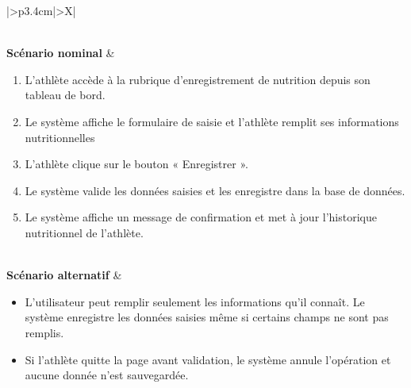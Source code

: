 \documentclass[a4paper,12pt]{report}
\begin{document}
\begin{table}[H]
\begin{tabularx}{\textwidth}{|>{\RaggedRight\arraybackslash}p{3.4cm}|>{\RaggedRight\arraybackslash}X|}
\begin{minipage}[t]{\linewidth}
\end{minipage} \\
\hline
\textbf{Scénario nominal} &
\begin{minipage}[t]{\linewidth}
\vspace{2pt}
\begin{enumerate}[label=\arabic*., leftmargin=*, topsep=0pt, itemsep=1pt]
    \item L'athlète accède à la rubrique d'enregistrement de nutrition depuis son tableau de bord.
    \item Le système affiche le formulaire de saisie et l'athlète remplit ses informations nutritionnelles 
    \item L'athlète clique sur le bouton « Enregistrer ».
    \item Le système valide les données saisies et les enregistre dans la base de données.
    \item Le système affiche un message de confirmation et met à jour l'historique nutritionnel de l'athlète.
\end{enumerate}
\vspace{2pt}
\end{minipage} \\
\hline
\textbf{Scénario alternatif} &
\begin{minipage}[t]{\linewidth}
\vspace{2pt}
\begin{itemize}[leftmargin=*, topsep=0pt, itemsep=1pt]
   \item  L'utilisateur peut remplir seulement les informations qu'il connaît. Le système enregistre les données saisies même si certains champs ne sont pas remplis.
    \item  Si l'athlète quitte la page avant validation, le système annule l'opération et aucune donnée n'est sauvegardée.
\end{itemize}
\vspace{2pt}
\end{minipage} \\
\hline
\end{tabularx}
\fussy
\end{table}
\end{document}
